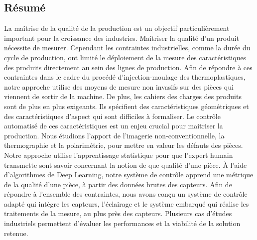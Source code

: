 {}

\vspace*{-1cm}
\begin{flushright}
\section*{\fontsize{20pt}{20pt}\selectfont\textnormal{Résumé}}
\end{flushright}

\fancyhf{}
\lfoot[\fancyplain{}{}]
{\fancyplain{}{}}
\cfoot[\fancyplain{}{\thepage}]
{\fancyplain{}{\thepage}}
\rfoot[\fancyplain{}{}]
{\fancyplain{}{\scriptsize}}
La maîtrise de la qualité de la production est un objectif particulièrement important pour la croissance des industries.
Maîtriser la qualité d'un produit nécessite de mesurer.
Cependant les contraintes industrielles, comme la durée du cycle de production, ont limité le déploiement de la mesure des caractéristiques des produits directement au sein des lignes de production.
Afin de répondre à ces contraintes dans le cadre du procédé d'injection-moulage des thermoplastiques, notre approche utilise des moyens de mesure non invasifs sur des pièces qui viennent de sortir de la machine.
De plus, les cahiers des charges des produits sont de plus en plus exigeants.
Ils spécifient des caractéristiques géométriques et des caractéristiques d'aspect qui sont difficiles à formaliser.
Le contrôle automatisé de ces caractéristiques est un enjeu crucial pour maitriser la production.
Nous étudions l'apport de l'imagerie non-conventionnelle, la thermographie et la polarimétrie, pour mettre en valeur les défauts des pièces.
Notre approche utilise l'apprentissage statistique pour que l'expert humain transmette sont savoir concernant la notion de que qualité d'une pièce.
À l'aide d'algorithmes de Deep Learning, notre système de contrôle apprend une métrique de la qualité d'une pièce, à partir des données brutes des capteurs.
Afin de répondre à l'ensemble des contraintes, nous avons conçu un système de contrôle adapté qui intègre les capteurs, l'éclairage et le système embarqué qui réalise les traitements de la mesure, au plus près des capteurs.
Plusieurs cas d'études industriels permettent d'évaluer les performances et la viabilité de la solution retenue.

